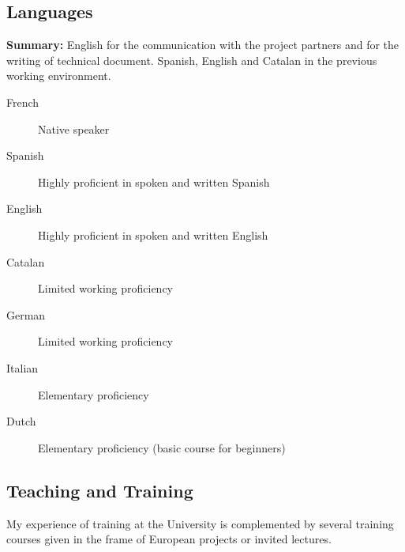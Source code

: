 \documentclass[11pt,a4paper,svgnames]{article}
\begin{document}
\subsection{Languages}
\textbf{Summary:} {English for the communication with the project partners and for the writing of technical document. Spanish, English and Catalan in the previous working environment.}

\begin{description}
\item[French] {Native speaker}
\item[Spanish] {Highly proficient in spoken and written Spanish}
\item[English] {Highly proficient in spoken and written English}
\item[Catalan] {Limited working proficiency}
\item[German] {Limited working proficiency}
\item[Italian] {Elementary proficiency}
\item[Dutch] {Elementary proficiency (basic course for beginners)}
\end{description}

\subsection{Teaching and Training}

\begin{summarybox}
My experience of training at the University is complemented by several training courses given in the frame of European projects or invited lectures.
\end{summarybox}
\end{document}
